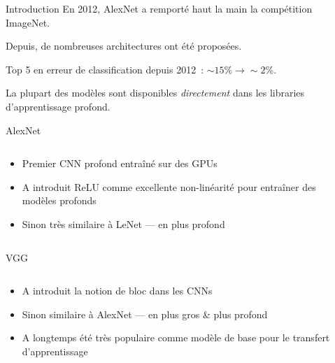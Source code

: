 \begin{frame}{Introduction}
  En 2012, AlexNet a remporté haut la main la compétition ImageNet.

  Depuis, de nombreuses architectures ont été proposées.

  Top 5 en erreur de classification depuis 2012~: $\sim15\% \rightarrow \sim2\%$.

  La plupart des modèles sont disponibles \emph{directement} dans les libraries d'apprentissage profond.
\end{frame}

\begin{frame}{AlexNet}
  \begin{columns}
    \begin{column}{0.5\textwidth}
      \begin{itemize}
        \item Premier CNN profond entraîné sur des GPUs
        \item A introduit ReLU comme excellente non-linéarité pour entraîner des modèles profonds
        \item Sinon très similaire à LeNet --- en plus profond
      \end{itemize}
    \end{column}
    \begin{column}{0.5\textwidth}
    \end{column}
  \end{columns}
\end{frame}

\begin{frame}{VGG}
  \begin{columns}
    \begin{column}{0.45\textwidth}
      \begin{itemize}
        \item A introduit la notion de bloc dans les CNNs
        \item Sinon similaire à AlexNet --- en plus gros \& plus profond
        \item A longtemps été très populaire comme modèle de base pour le transfert d'apprentissage
      \end{itemize}
    \end{column}
    \begin{column}{0.55\textwidth}
    \end{column}
  \end{columns}
\end{frame}


